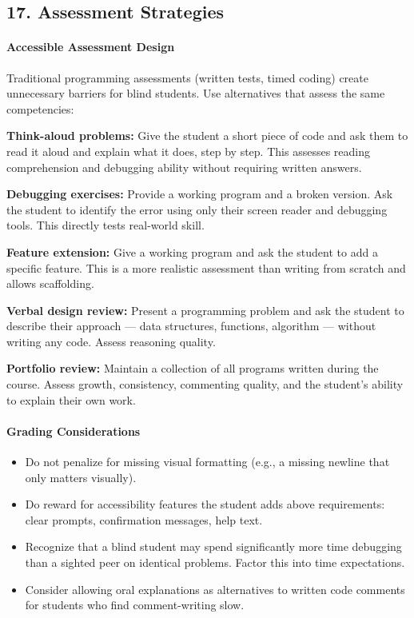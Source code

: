\documentclass[
  justified,
  openright,
]{tufte-book}
\let\subsubsection\paragraph
\let\paragraph\paragraph
\let\subsubsection\paragraph
\let\paragraph\paragraph
\providecommand{\tightlist}{%
  \setlength{\itemsep}{0pt}\setlength{\parskip}{0pt}}
\begin{document}
\subsection{17. Assessment Strategies}\label{assessment-strategies}

\subsubsection{Accessible Assessment
Design}\label{accessible-assessment-design}

Traditional programming assessments (written tests, timed coding) create
unnecessary barriers for blind students. Use alternatives that assess
the same competencies:

\textbf{Think-aloud problems:} Give the student a short piece of code
and ask them to read it aloud and explain what it does, step by step.
This assesses reading comprehension and debugging ability without
requiring written answers.

\textbf{Debugging exercises:} Provide a working program and a broken
version. Ask the student to identify the error using only their screen
reader and debugging tools. This directly tests real-world skill.

\textbf{Feature extension:} Give a working program and ask the student
to add a specific feature. This is a more realistic assessment than
writing from scratch and allows scaffolding.

\textbf{Verbal design review:} Present a programming problem and ask the
student to describe their approach --- data structures, functions,
algorithm --- without writing any code. Assess reasoning quality.

\textbf{Portfolio review:} Maintain a collection of all programs written
during the course. Assess growth, consistency, commenting quality, and
the student's ability to explain their own work.

\subsubsection{Grading Considerations}\label{grading-considerations}

\begin{itemize}
\tightlist
\item
  Do not penalize for missing visual formatting (e.g., a missing newline
  that only matters visually).
\item
  Do reward for accessibility features the student adds above
  requirements: clear prompts, confirmation messages, help text.
\item
  Recognize that a blind student may spend significantly more time
  debugging than a sighted peer on identical problems. Factor this into
  time expectations.
\item
  Consider allowing oral explanations as alternatives to written code
  comments for students who find comment-writing slow.
\end{itemize}
\end{document}

